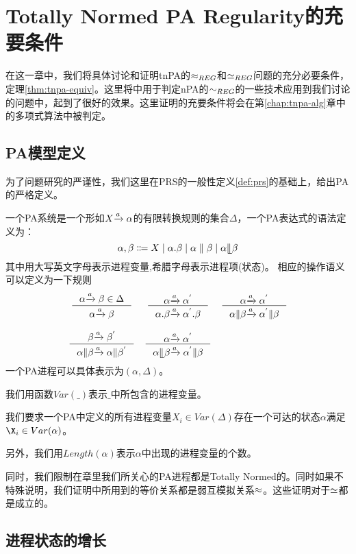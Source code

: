 \chapter{Totally Normed PA Regularity的充要条件}
\label{chap:tnpa-equiv}

在这一章中，我们将具体讨论和证明tnPA的$\approx_{REG}$和$\simeq_{REG}$问题的充分必要条件，定理\ref{thm:tnpa-equiv}。这里将\cite{Kucera1996}中用于判定nPA的$\sim_{REG}$的一些技术应用到我们讨论的问题中，起到了很好的效果。这里证明的充要条件将会在第\ref{chap:tnpa-alg}章中的多项式算法中被判定。

\section{PA模型定义}
\label{sec:pa-def}

为了问题研究的严谨性，我们这里在PRS的一般性定义\ref{def:prs}的基础上，给出PA的严格定义。

\begin{defn}[PA 定义]\label{def:pa}
一个PA系统是一个形如$X{\xrightarrow{a}{}}\alpha$的有限转换规则的集合$\Delta$，一个PA表达式的语法定义为：
$$\alpha,\beta\Coloneqq X\mid \alpha.\beta\mid\alpha\parallel\beta\mid\alpha\llfloor\beta$$
其中用大写英文字母表示进程变量,希腊字母表示进程项(状态)。
相应的操作语义可以定义为一下规则
\[\begin{array}{ccc}
$\inference{\alpha\act{a}\beta\in\Delta}{\alpha\act{a}\beta}$ &
$\inference{\alpha\act{a}\alpha^{'}}{\alpha.\beta\act{a}\alpha^{'}.\beta}$ &
$\inference{\alpha\act{a}\alpha^{'}}{\alpha\| \beta\act{a}\alpha^{'}\|\beta}$ \\
 \\
$\inference{\beta\act{a}\beta^{'}}{\alpha\| \beta\act{a}\alpha \| \beta^{'}}$ &
$\inference{\alpha\act{a}\alpha^{'}}{\alpha\llfloor \beta\act{a}\alpha^{'}\|\beta}$ &
\end{array}\]
一个PA进程可以具体表示为$(\alpha,\Delta)$。
\end{defn}

我们用函数$Var(\_)$表示$\_$中所包含的进程变量。

我们要求一个PA中定义的所有进程变量$X_i\in Var(\Delta)$存在一个可达的状态$\alpha$满足$\X_i\in Var(\alpha)$。

另外，我们用$Length(\alpha)$表示$\alpha$中出现的进程变量的个数。

同时，我们限制在章里我们所关心的PA进程都是Totally Normed的。同时如果不特殊说明，我们证明中所用到的等价关系都是弱互模拟关系$\approx$。这些证明对于$\simeq$都是成立的。

\section{进程状态的增长}
\label{sec:grow-prop}

